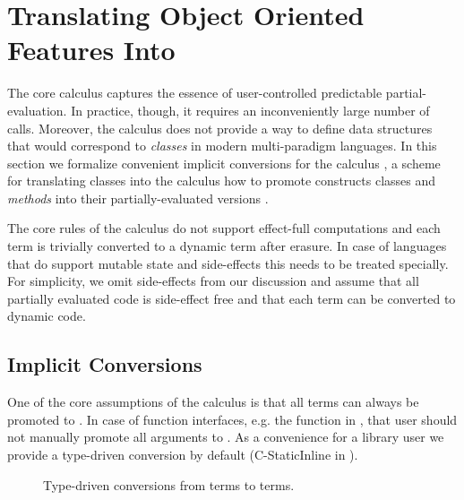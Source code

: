 \section{Translating Object Oriented Features Into \calculus}
\label{sct:scala-translation}


The core calculus  captures the essence of user-controlled
 predictable partial-evaluation. In practice, though, it requires an inconveniently large number
 of  calls. Moreover, the calculus does not provide a way to define
 data structures that would correspond to \emph{classes} in modern multi-paradigm languages.
 In this section we formalize convenient implicit conversions for the calculus , a scheme for
 translating classes into the calculus how to promote constructs classes and \emph{methods} into their
 partially-evaluated versions .


The core rules of the calculus do not support effect-full computations and each
  term is trivially converted to a dynamic term after erasure.
 In case of languages that do support mutable state and side-effects this needs to
 be treated specially. For simplicity, we omit side-effects from our discussion and
 assume that all partially evaluated code is side-effect free and that each
  term can be converted to dynamic code.

\subsection{Implicit Conversions}
\label{sct:conversions}

One of the core assumptions of the calculus is that all  terms can
 always be promoted to . In case of function interfaces, e.g. the
  function in , that user should not manually
 promote all arguments to . As a convenience for a library user
 we provide a type-driven conversion by default (C-StaticInline in ).

\begin{figure}

    {\Gamma \ts {}}

\caption{Type-driven conversions from  terms to  terms.}
\label{fig:conversions}
\end{figure}

